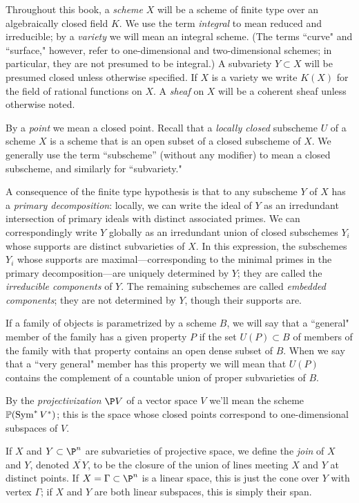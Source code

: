 Throughout this book, a \emph{scheme} $X$ will be a scheme of finite type over an algebraically closed field
$K$. We use the term \emph{integral} to mean reduced and irreducible; by a \emph{variety} we will mean an integral scheme. (The terms ``curve" and ``surface," however, refer to one-dimensional and two-dimensional schemes; in particular, they are not presumed to be integral.) A subvariety $Y \subset X$ will be presumed closed unless otherwise specified.
 If $X$ is a variety we write $K(X)$ for the field of rational functions on $X$. A \emph{sheaf} on $X$ will be a coherent sheaf unless otherwise noted.
 
By a \emph{point}
we mean a closed point. 
Recall that a \emph{locally closed} subscheme $U$ of a scheme $X$ is 
a scheme that is an open subset of a closed subscheme of $X$. We generally use the term
``subscheme'' (without any modifier) to mean a closed subscheme, and similarly for ``subvariety."

A consequence of the finite type hypothesis
is that to any subscheme $Y$ of 
$X$ has a \emph{primary decomposition}: locally, we can write the ideal of $Y$ as an irredundant intersection of primary ideals with distinct associated primes. We can correspondingly write $Y$ globally as an irredundant union of closed subschemes $Y_i$ whose supports are distinct subvarieties of $X$. In this expression, the subschemes $Y_i$ whose supports are maximal---corresponding to the minimal primes in the primary decomposition---are uniquely determined by $Y$; they are called the \emph{irreducible components} of $Y$. The remaining subschemes are called \emph{embedded components}; they are not determined by $Y$, though their supports are.

If a family of objects is parametrized by a scheme $B$, we will say that a ``general" member of the family has a given property $P$ if the set $U(P) \subset B$ of members of the family with that property contains an open dense subset of $B$. When we say that a ``very general" member has this property  we will mean that $U(P)$ contains the complement of a countable union of proper subvarieties of $B$.


By the \emph{projectivization} $\P V$ of a vector space $V$ we'll mean the scheme ${\mathbb P}(\operatorname{Sym}^* V^*)$; this is the space whose closed points correspond to one-dimensional subspaces of $V$.

If $X$ and $Y \subset \P^n$ are subvarieties of projective space, we define the \emph{join} of $X$ and $Y$, denoted $\overline{X\,Y}$, to be the closure of the union of lines meeting $X$ and $Y$ at distinct points. If $X = \Gamma \subset \P^n$ is a linear space, this is just the cone over $Y$ with vertex $\Gamma$; if $X$ and $Y$ are both linear subspaces, this is simply their span.


